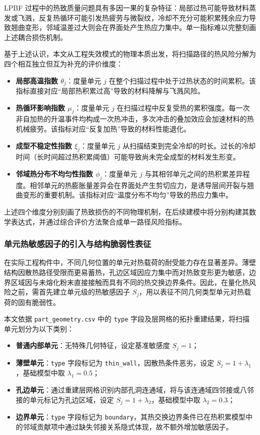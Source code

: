 \documentclass[a4paper, 12pt]{ctexart}
\begin{document}
LPBF 过程中的热致质量问题具有多因一果的复杂特征：局部过热可能导致材料蒸发或飞溅，反复热循环可能引发热疲劳与微裂纹，冷却不充分可能积累残余应力导致翘曲变形，邻域温差过大则会在界面处产生热应力集中。单一指标难以完整刻画上述耦合损伤机制。

基于上述认识，本文从工程失效模式的物理本质出发，将扫描路径的热风险分解为四个相互独立但互为补充的评价维度：
\begin{itemize}
\item\textbf{局部高温指数 $\theta_j$}：度量单元 $j$ 在整个扫描过程中处于过热状态的时间累积。该指标直接对应“局部热积累过高”导致的材料降解与飞溅风险。

\item\textbf{热循环影响指数 $\mu_j$}：度量单元 $j$ 在扫描过程中反复受热的累积强度。每一次非自加热的升温事件均构成一次热冲击，多次冲击的叠加效应会加速材料的热机械疲劳。该指标对应“反复加热”导致的材料性能退化。

\item\textbf{成型不稳定性指数 $\xi_j$}：度量单元 $j$ 从扫描结束到完全冷却的时长。过长的冷却时间（长时间超过热积累阈值）可能导致尚未完全成型的材料发生形变。

\item\textbf{邻域热分布不均匀性指数 $\phi_j$}：度量单元 $j$ 与其相邻单元之间的热积累差异程度。相邻单元的热膨胀量差异会在界面处产生剪切应力，是诱导层间开裂与翘曲变形的重要机制。该指标对应“温度分布不均匀”导致的热应力集中。
\end{itemize}

上述四个维度分别刻画了热致损伤的不同物理机制，在后续建模中将分别构建其数学表达式，并通过综合评价方法聚合成单一路径风险指标。

\subsubsection{单元热敏感因子的引入与结构脆弱性表征}

在实际工程构件中，不同几何位置的单元对热载荷的耐受能力存在显著差异。薄壁结构因散热路径受限而更易蓄热，孔边区域因应力集中而对热致变形更为敏感，边界区域因与未熔化粉末直接接触而具有不同的热交换边界条件。因此，在量化热风险之前，需首先建立单元级的热敏感因子 $S_j$，用以表征不同几何类型单元对热载荷的固有脆弱性。

本文依据 \texttt{part\_geometry.csv} 中的 \texttt{type} 字段及层网格的拓扑重建结果，将扫描单元划分为以下类别：
\begin{itemize}
    \item \textbf{普通内部单元}：无特殊几何特征，设定基准敏感度 $S_j = 1$；
    \item \textbf{薄壁单元}：\texttt{type} 字段标记为 \texttt{thin\_wall}，因散热条件恶劣，设定 $S_j = 1 + \lambda_1$，基础模型中取 $\lambda_1 = 0.5$；
    \item \textbf{孔边单元}：通过重建层网格识别内部孔洞连通域，将与该连通域四邻接或八邻接的单元标记为孔边区域，设定 $S_j = 1 + \lambda_2$，基础模型中取 $\lambda_2 = 0.3$；
    \item \textbf{边界单元}：\texttt{type} 字段标记为 \texttt{boundary}，其热交换边界条件已在热积累模型中的邻域贡献项中通过缺失邻接关系隐式体现，故不额外增加敏感因子。
\end{itemize}
\end{document}
